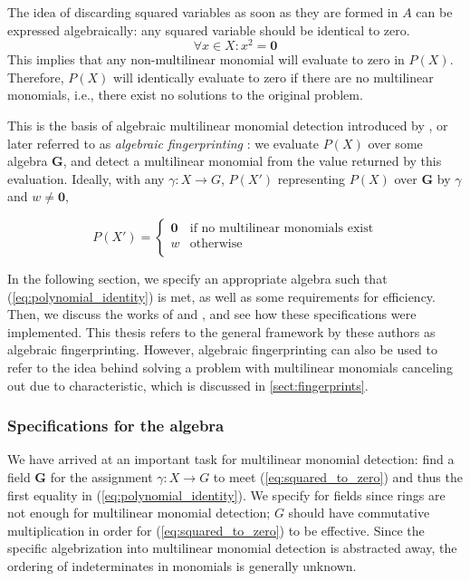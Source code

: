 The idea of discarding squared variables as soon as they are formed in $A$ 
can be expressed algebraically: any squared variable should be identical to
zero. 
\begin{equation}
  \label{eq:squared_to_zero}
\forall x \in X: x^2 = \mathbf{0}
\end{equation}
This implies that any non-multilinear monomial will evaluate to zero in $P(X)$. 
Therefore, $P(X)$ will identically evaluate to zero if there are no multilinear monomials, 
i.e., there exist no solutions to the original problem.

This is the basis of algebraic multilinear monomial detection introduced by 
\citeauthor{Koutis08} \cite{Koutis08}, or later referred to as \emph{algebraic fingerprinting} \cite{KouWil15}: 
we evaluate $P(X)$ over some algebra $\mathbf{G}$, and detect a multilinear monomial from 
the value returned by this evaluation. Ideally, with any $\gamma \colon X \to G$, $P(X')$ representing 
$P(X)$ over $\mathbf{G}$ by $\gamma$ and $w \neq \mathbf{0}$, 

\begin{equation}
  \label{eq:polynomial_identity}
  P(X') =
    \begin{cases}
      \mathbf{0} & \text{if no multilinear monomials exist}\\
      w & \text{otherwise}\\
    \end{cases}       
\end{equation}

In the following section, we specify an appropriate algebra such that 
(\ref{eq:polynomial_identity}) is met, as well as some requirements for efficiency. 
Then, we discuss the works of \citeauthor{Koutis08} and \citeauthor{Williams09} \cite{Koutis08, Williams09}, 
and see how these specifications were implemented. 
This thesis refers to the general framework \cite{KouWil15} by these 
authors as algebraic fingerprinting. However, algebraic fingerprinting can also 
be used to refer to the idea behind solving a problem 
with multilinear monomials canceling out due to characteristic, 
which is discussed in \cref{sect:fingerprints}.

\subsubsection{Specifications for the algebra}

We have arrived at an important task for multilinear monomial detection: 
find a field $\mathbf{G}$ for 
the assignment $\gamma \colon X \to G$ to meet 
(\ref{eq:squared_to_zero}) and thus the first equality in (\ref{eq:polynomial_identity}). 
We specify for fields since rings are not enough for multilinear monomial detection; 
$G$ should have commutative multiplication in order for (\ref{eq:squared_to_zero}) 
to be effective. Since the specific algebrization into multilinear monomial detection 
is abstracted away, the ordering of indeterminates in monomials is generally unknown.

